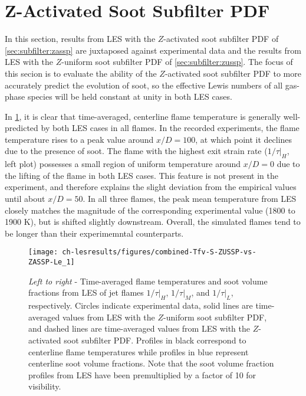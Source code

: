 \section{Z-Activated Soot Subfilter PDF}
\label{sec:lesresults:zassp}

In this section, results from LES with the $Z$-activated soot subfilter PDF of \cref{sec:subfilter:zassp} are juxtaposed against experimental data and the results from LES with the $Z$-uniform soot subfilter PDF of \cref{sec:subfilter:zussp}. The focus of this secion is to evaluate the ability of the $Z$-activated soot subfilter PDF to more accurately predict the evolution of soot, so the effective Lewis numbers of all gas-phase species will be held constant at unity in both LES cases.  

In \cref{fig:lesresults:zassp:ctrlineleseval}, it is clear that time-averaged, centerline flame temperature is generally well-predicted by both LES cases in all flames. In the recorded experiments, the flame temperature rises to a peak value around $x/D = 100$, at which point it declines due to the presence of soot. The flame with the highest exit strain rate ($1/\tau|_H$, left plot) possesses a small region of uniform temperature around $x/D = 0$ due to the lifting of the flame in both LES cases. This feature is not present in the experiment, and therefore explains the slight deviation from the empirical values until about $x/D = 50$. In all three flames, the peak mean temperature from LES closely matches the magnitude of the corresponding experimental value (1800 to 1900 K), but is shifted slightly downstream. Overall, the simulated flames tend to be longer than their experimemntal counterparts.

\begin{figure}[htb]
  \centering
  \texttt{[image: ch-lesresults/figures/combined-Tfv-S-ZUSSP-vs-ZASSP-Le\_1]}
  \caption[Centerline \texorpdfstring{$\langle T \rangle$}{<T>} \& \texorpdfstring{$\langle f_V \rangle$}{<fV>} from LES with \texorpdfstring{$Z$}{Z}-Activated Soot Subfilter PDF]{\textit{Left to right} - Time-averaged flame temperatures and soot volume fractions from LES of jet flames $1/\tau|_H$, $1/\tau|_M$, and $1/\tau|_L$, respectively. Circles indicate experimental data, solid lines are time-averaged values from LES with the $Z$-uniform soot subfilter PDF, and dashed lines are time-averaged values from LES with the $Z$-activated soot subfilter PDF. Profiles in black correspond to centerline flame temperatures while profiles in blue represent centerline soot volume fractions. Note that the soot volume fraction profiles from LES have been premultiplied by a factor of 10 for visibility.}
  \label{fig:lesresults:zassp:ctrlineleseval}
\end{figure}

